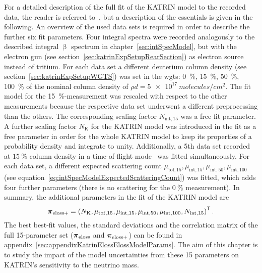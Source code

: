 For a detailed description of the full fit of the KATRIN model to the recorded data, the reader is referred to~\cite{Hannen2019_1}, but a description of the essentials is given in the following. An overview of the used data sets is required in order to describe the further six fit parameters. Four integral spectra were recorded analogously to the described integral $\upbeta$ spectrum in chapter~\ref{sec:intSpecModel}, but with the electron gun (see section~\ref{sec:katrinExpSetupRearSection}) as electron source instead of tritium. For each data set a different deuterium column density (see section~\ref{sec:katrinExpSetupWGTS}) was set in the \gls{wgts}: \SI{0}{\percent}, \SI{15}{\percent}, \SI{50}{\percent}, \SI{100}{\percent} of the nominal column density of $\rho d = \SI{5e17}{molecules/cm^2}$. The fit model for the \mbox{\SI{15}{\percent}-measurement} was rescaled with respect to the other measurements because the respective data set underwent a different preprocessing than the others. The corresponding scaling factor $N_{\mathrm{int},15}$ was a free fit parameter. A further scaling factor $N_\mathrm{K}$ for the KATRIN model was introduced in the fit as a free parameter in order for the whole KATRIN model to keep its properties of a probability density and integrate to unity. Additionally, a 5th data set recorded at $\SI{15}{\percent}$ column density in a time-of-flight mode~\cite{Bonn1999} was fitted simultaneously. For each data set, a different expected scattering count $
\mu_{\mathrm{tof},15}, 
\mu_{\mathrm{int},15},  
\mu_{\mathrm{int},50},  
\mu_{\mathrm{int},100}$ (see equation~\ref{eq:intSpecModelExpectedScatteringCount}) was fitted, which adds four further parameters (there is no scattering for the $\SI{0}{\percent}$ measurement). In summary, the additional parameters in the fit of the KATRIN model are
\begin{equation}
\label{eq:katrinElossElossModelExtendedParams}
	\boldsymbol{\mathbf{\pi}}_\mathrm{eloss+} = 
	{\left(
		N_\mathrm{K},
		\mu_{\mathrm{tof},15},
		\mu_{\mathrm{int},15}, 
		\mu_{\mathrm{int},50}, 
		\mu_{\mathrm{int},100},
		N_{\mathrm{int},15}
		\right)}^{\mathsf{T}}
	\text{\,.}
\end{equation}
The best best-fit values, the standard deviations and the correlation matrix of the full 15-parameter set ($\boldsymbol{\mathbf{\pi}}_\mathrm{eloss}$ and $\boldsymbol{\mathbf{\pi}}_\mathrm{eloss+}$) can be found in appendix~\ref{sec:appendixKatrinElossElossModelParams}. The aim of this chapter is to study the impact of the model uncertainties from these 15 parameters on KATRIN's sensitivity to the neutrino mass.

